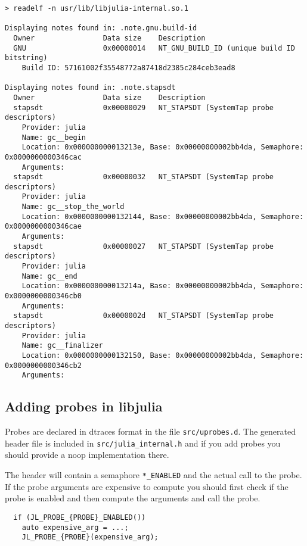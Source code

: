 \begin{lstlisting}
> readelf -n usr/lib/libjulia-internal.so.1

Displaying notes found in: .note.gnu.build-id
  Owner                Data size 	Description
  GNU                  0x00000014	NT_GNU_BUILD_ID (unique build ID bitstring)
    Build ID: 57161002f35548772a87418d2385c284ceb3ead8

Displaying notes found in: .note.stapsdt
  Owner                Data size 	Description
  stapsdt              0x00000029	NT_STAPSDT (SystemTap probe descriptors)
    Provider: julia
    Name: gc__begin
    Location: 0x000000000013213e, Base: 0x00000000002bb4da, Semaphore: 0x0000000000346cac
    Arguments:
  stapsdt              0x00000032	NT_STAPSDT (SystemTap probe descriptors)
    Provider: julia
    Name: gc__stop_the_world
    Location: 0x0000000000132144, Base: 0x00000000002bb4da, Semaphore: 0x0000000000346cae
    Arguments:
  stapsdt              0x00000027	NT_STAPSDT (SystemTap probe descriptors)
    Provider: julia
    Name: gc__end
    Location: 0x000000000013214a, Base: 0x00000000002bb4da, Semaphore: 0x0000000000346cb0
    Arguments:
  stapsdt              0x0000002d	NT_STAPSDT (SystemTap probe descriptors)
    Provider: julia
    Name: gc__finalizer
    Location: 0x0000000000132150, Base: 0x00000000002bb4da, Semaphore: 0x0000000000346cb2
    Arguments:
\end{lstlisting}



\hypertarget{11396479853674722935}{}


\subsection{Adding probes in libjulia}



Probes are declared in dtraces format in the file \texttt{src/uprobes.d}. The generated header file is included in \texttt{src/julia\_internal.h} and if you add probes you should provide a noop implementation there.



The header will contain a semaphore \texttt{*\_ENABLED} and the actual call to the probe. If the probe arguments are expensive to compute you should first check if the probe is enabled and then compute the arguments and call the probe.




\begin{lstlisting}
  if (JL_PROBE_{PROBE}_ENABLED())
    auto expensive_arg = ...;
    JL_PROBE_{PROBE}(expensive_arg);
\end{lstlisting}



